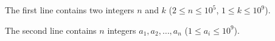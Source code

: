 The first line contains two integers $n$ and $k$ ($2 \le n \le 10^5$, $1 \le k \le 10^9$).

The second line contains $n$ integers $a_1, a_2, \ldots, a_n$ ($1 \le a_i \le 10^9$).

